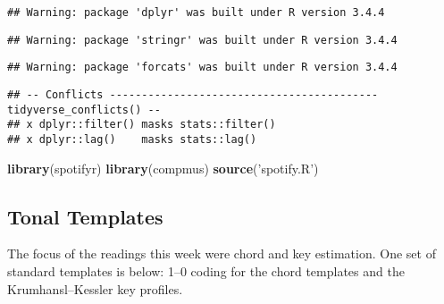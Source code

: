 \documentclass[]{article}
\newenvironment{Shaded}{\begin{snugshade}}{\end{snugshade}}
\newcommand{\KeywordTok}[1]{\textcolor[rgb]{0.13,0.29,0.53}{\textbf{#1}}}
\newcommand{\NormalTok}[1]{#1}
\newcommand{\StringTok}[1]{\textcolor[rgb]{0.31,0.60,0.02}{#1}}
\begin{document}
\begin{verbatim}
## Warning: package 'dplyr' was built under R version 3.4.4
\end{verbatim}

\begin{verbatim}
## Warning: package 'stringr' was built under R version 3.4.4
\end{verbatim}

\begin{verbatim}
## Warning: package 'forcats' was built under R version 3.4.4
\end{verbatim}

\begin{verbatim}
## -- Conflicts ------------------------------------------ tidyverse_conflicts() --
## x dplyr::filter() masks stats::filter()
## x dplyr::lag()    masks stats::lag()
\end{verbatim}

\begin{Shaded}
\begin{Highlighting}[]
\KeywordTok{library}\NormalTok{(spotifyr)}
\KeywordTok{library}\NormalTok{(compmus)}
\KeywordTok{source}\NormalTok{(}\StringTok{'spotify.R'}\NormalTok{)}
\end{Highlighting}
\end{Shaded}

\hypertarget{tonal-templates}{%
\subsection{Tonal Templates}\label{tonal-templates}}

The focus of the readings this week were chord and key estimation. One
set of standard templates is below: 1--0 coding for the chord templates
and the Krumhansl--Kessler key profiles.
\end{document}
